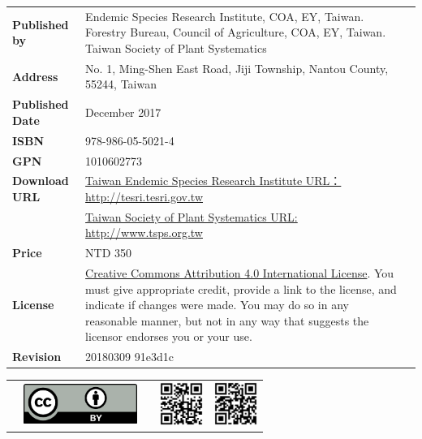 \begin{table}[H]
{\begin{tabular}{>{\raggedleft\arraybackslash}p{2.5cm}p{9cm}p{3cm}}
      \textbf{Published by}       & Endemic Species Research Institute, COA, EY, Taiwan.
                                    Forestry Bureau, Council of Agriculture, COA, EY, Taiwan.
                                    Taiwan Society of Plant Systematics  & \\
      \textbf{Address}            & No. 1, Ming-Shen East Road, Jiji Township, Nantou County, 55244, Taiwan  & \\
      \textbf{Published Date}     & December 2017  & \\
      \textbf{ISBN}               & 978-986-05-5021-4  & \\
      \textbf{GPN}                & 1010602773  & \\
      \textbf{Download URL}  & \href{http://tesri.tesri.gov.tw}{Taiwan Endemic Species Research Institute URL：http://tesri.tesri.gov.tw}  & \\
                                  & \href{http://www.tsps.org.tw}{Taiwan Society of Plant Systematics URL: http://www.tsps.org.tw}  & \\
      \textbf{Price}              & NTD 350  & \\
      \textbf{License}            & \href{https://creativecommons.org/licenses/by/4.0}{Creative Commons Attribution 4.0 International License}.
                                     You must give appropriate credit, provide a link to the license,
                                     and indicate if changes were made. You may do so in any reasonable manner,
                                     but not in any way that suggests the licensor endorses you or your use.  & \\
      \textbf{Revision}              & 20180309 91e3d1c \\
  \end{tabular}
  }
  \begin{tabular}{p{2.5cm}p{3cm}p{1.0cm}p{1.6cm}p{1.6cm}}
    & \includegraphics[width=10em]{images/ccby40.png} & &
    \includegraphics[width=1.4cm]{images/tesri.png} &
    \includegraphics[width=1.4cm]{images/tsps.png} \\
  \end{tabular}

\end{table}
